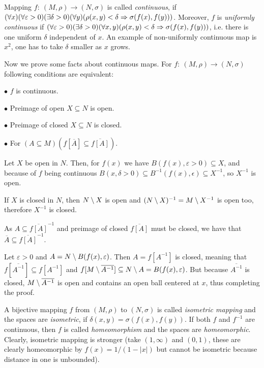 \medskip

Mapping $f:\ (M,\rho)\to(N,\sigma)$ is called {\it continuous}, if $(\forall x)
(\forall \varepsilon > 0)(\exists \delta > 0)(\forall y)(\rho(x,y) < \delta 
\Rightarrow \sigma(f(x),f(y)))$. Moreover, $f$ is {\it uniformly continuous} if 
$(\forall \varepsilon>0)(\exists \delta > 0)(\forall x,y)(\rho(x,y) < \delta 
\Rightarrow \sigma(f(x),f(y)))$, i.e. there is one uniform $\delta$ independent of 
$x$.
\smallskip
An example of non-uniformly continuous map is $x^2$, one has to take $\delta$ 
smaller as $x$ grows.

\medskip
Now we prove some facts about continuous maps. For $f:\ (M,\rho)\to(N,\sigma)$ 
following conditions are equivalent:

{\parindent0.5in\parskip6pt
	\item{$\bullet$} $f$ is continuous.
	\item{$\bullet$} Preimage of open $X\subseteq N$ is open.
	\item{$\bullet$} Preimage of closed $X\subseteq N$ is closed.
	\item{$\bullet$} For $(A\subseteq M)(f[\overline A] \subseteq \overline
		{f[A]})$.

}

Let $X$ be open in $N$. Then, for $f(x)$ we have $B(f(x),\varepsilon>0)
\subseteq X$, and because of $f$ being continuous $B(x,\delta>0)\subseteq 
B^{-1}(f(x), \epsilon) \subseteq X^{-1}$, so $X^{-1}$ is open. 

If $X$ is closed in $N$, then $N\setminus X$ is open and $(N\setminus X)^{-1} = 
M\setminus X^{-1}$ is open too, therefore $X^{-1}$ is closed.

As $A\subseteq \overline{f[A]}^{-1}$ and preimage of closed $\overline{f[A]}
$ must be closed, we have that $\overline A\subseteq \overline{f[A]}^{-1}$.

Let $\varepsilon > 0$ and $A=N\setminus B(f(x),\varepsilon)$. Then $A=f[A^{-1}]$ is 
closed, meaning that $f[\overline{A^{-1}}] \subseteq f[A^{-1}]$ and $f[M\setminus 
\overline{ A^{-1}}] \subseteq N\setminus A = B(f(x),\varepsilon)$. But because 
$\overline{ A^{-1}}$ is closed, $M\setminus \overline{ A^{-1}}$ is open and contains 
an open ball centered at $x$, thus completing the proof.

\medskip

 A bijective mapping $f$ from $(M,\rho)$ to $(N,\sigma)$ is 
called {\it isometric mapping} and the spaces are {\it isometric}, if 
$\delta(x,y) = \sigma(f(x),f(y))$. If both $f$ and $f^{-1}$ are continuous, 
then $f$ is called {\it homeomorphism} and the spaces are {\it homeomorphic}. 
Clearly, isometric mapping is stronger (take $(1,\infty)$ and $(0,1)$, these are
clearly homeomorphic by $f(x) = 1/(1 - |x|)$ but cannot be isometric because 
distance in one is unbounded).
\smallskip

